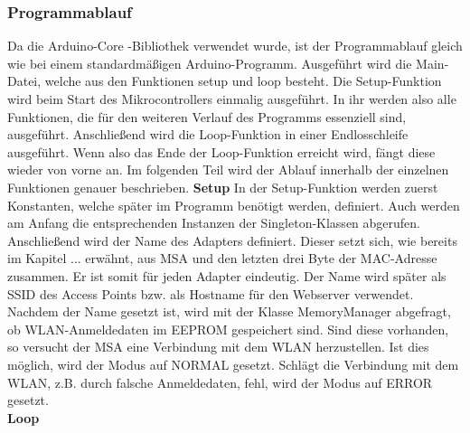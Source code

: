 \documentclass[11pt, twoside]{article}
\begin{document}
\subsubsection{Programmablauf}
Da die \glqq Arduino-Core \grqq{} -Bibliothek verwendet wurde, ist der Programmablauf gleich wie bei einem standardmäßigen Arduino-Programm. Ausgeführt wird die Main-Datei, welche aus den Funktionen \glqq setup \grqq{} und \glqq loop \grqq{} besteht. Die Setup-Funktion wird beim Start des Mikrocontrollers einmalig ausgeführt. In ihr werden also alle Funktionen, die für den weiteren Verlauf des Programms essenziell sind, ausgeführt. Anschließend wird die Loop-Funktion in einer Endlosschleife ausgeführt. Wenn also das Ende der Loop-Funktion erreicht wird, fängt diese wieder von vorne an. Im folgenden Teil wird der Ablauf innerhalb der einzelnen Funktionen genauer beschrieben.
\vspace{4mm}\newline
\textbf{Setup} \newline
In der Setup-Funktion werden zuerst Konstanten, welche später im Programm benötigt werden, definiert. Auch werden am Anfang die entsprechenden Instanzen der Singleton-Klassen abgerufen. Anschließend wird der Name des Adapters definiert. Dieser setzt sich, wie bereits im Kapitel ... erwähnt, aus \glqq MSA \grqq{} und den letzten drei Byte der MAC-Adresse zusammen. Er ist somit für jeden Adapter eindeutig. Der Name wird später als SSID des Access Points bzw. als Hostname für den Webserver verwendet. Nachdem der Name gesetzt ist, wird mit der Klasse \glqq MemoryManager \grqq{} abgefragt, ob WLAN-Anmeldedaten im EEPROM gespeichert sind. Sind diese vorhanden, so versucht der MSA eine Verbindung mit dem WLAN herzustellen. Ist dies möglich, wird der Modus auf \glqq NORMAL \grqq{} gesetzt. Schlägt die Verbindung mit dem WLAN, z.B. durch falsche Anmeldedaten, fehl, wird der Modus auf \glqq ERROR \grqq{} gesetzt. \newline \\
\textbf{Loop} \newline
\end{document}
